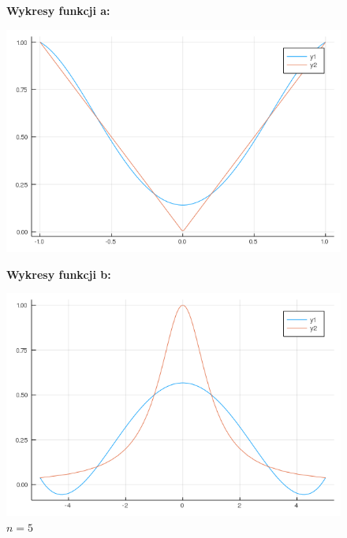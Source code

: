 \documentclass[11pt, a4paper]{article}
\begin{document}
    \begin{figure}[H]
        \captionsetup{labelformat = empty}
        \begin{minipage}{0.5\textwidth}
            \centerline{\textbf{Wykresy funkcji a:}}
            \caption{$n=5$}
            \centering
            \includegraphics[width=\linewidth]{plot-6_a_n5}
        \end{minipage}
        \begin{minipage}{0.5\textwidth}
            \centerline{\textbf{Wykresy funkcji b:}}
            \caption{$n=5$}
            \centering
            \includegraphics[width=\linewidth]{plot-6_b_n5}
        \end{minipage}


\end{figure}
\end{document}
